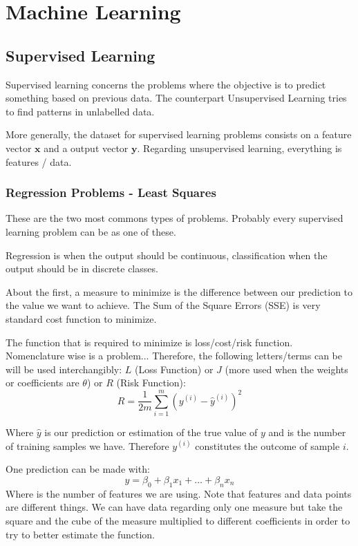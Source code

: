 
\section{Machine Learning}

\subsection{Supervised Learning}

Supervised learning concerns the problems where the objective is to predict something based on previous data. The counterpart Unsupervised Learning tries to find patterns in unlabelled data.

More generally, the dataset for supervised learning problems consists on a feature vector $\mathbf{x}$ and a output vector $\mathbf{y}$. Regarding unsupervised learning, everything is features / data.


\subsubsection{Regression Problems - Least Squares}
These are the two most commons types of problems. Probably every supervised learning problem can be  as one of these.

Regression is when the output should be continuous, classification when the output should be in discrete classes. 

About the first, a measure to minimize is the difference between our prediction to the value we want to achieve. The Sum of the Square Errors (SSE) is very standard cost function to minimize.

The function that is required to minimize is loss/cost/risk function. Nomenclature wise is a problem... Therefore, the following letters/terms can be will be used interchangibly: $L$ (Loss Function) or $J$ (more used when the weights or coefficients are $\theta$) or $R$ (Risk Function):
\begin{equation}
    R = \frac{1}{2m} \sum_{i = 1}^m \left(y^{(i)} - \hat{y}^{(i)}\right)^2
\end{equation}

Where $\hat{y}$ is our prediction or estimation of the true value of $y$ and  is the number of training samples we have. Therefore $y^(i)$ constitutes the outcome of sample $i$.

One prediction can be made with:
\begin{equation}
    \hat{y} = \beta_0 + \beta_1 x_1 + \dots + \beta_n x_n
\end{equation}
Where  is the number of features we are using. Note that features and data points are different things. We can have data regarding only one measure but take the square and the cube of the measure multiplied to different coefficients in order to try to better estimate the function.

